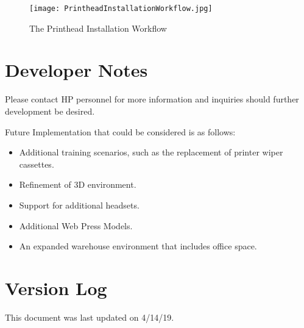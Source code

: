 \documentclass[onecolumn, draftclsnofoot,10pt, compsoc]{IEEEtran}
\begin{document}
\begin{figure}[ht!]
    \centering
    \texttt{[image: PrintheadInstallationWorkflow.jpg]}
    \caption{The Printhead Installation Workflow}
    \label{fig:workflow}
\end{figure}
\section{Developer Notes}

Please contact HP personnel for more information and inquiries should further development be desired.

Future Implementation that could be considered is as follows: 
\begin{itemize}
    \item Additional training scenarios, such as the replacement of printer wiper cassettes.
    \item Refinement of 3D environment.
    \item Support for additional headsets.
    \item Additional Web Press Models. 
    \item An expanded warehouse environment that includes office space.
\end{itemize}

\section{Version Log}
This document was last updated on 4/14/19.
\end{document}
